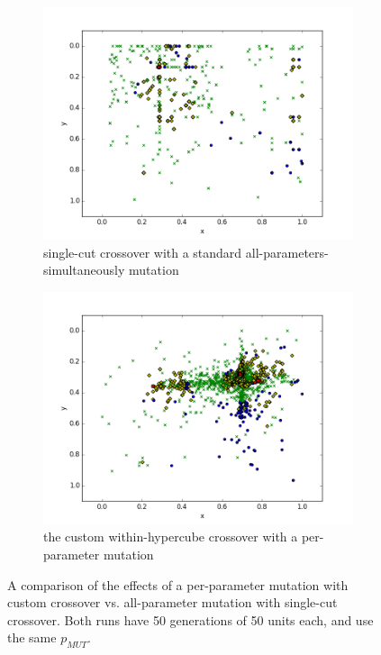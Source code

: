 \documentclass[times, utf8, diplomski]{fer}
\begin{document}
\begin{figure}[htp]
    \vspace{-50pt}      %
    \centering
    \begin{subfigure}[b]{\textwidth}
        \includegraphics[width=\textwidth]{images/mutation_crossover_effect_comparison_traditional.png}
        \caption{single-cut crossover with a standard all-parameters-simultaneously mutation}
    \end{subfigure}

    \begin{subfigure}[b]{\textwidth}
        \includegraphics[width=\textwidth]{images/mutation_crossover_effect_comparison_myalgo.png}
        \caption{the custom within-hypercube crossover with a per-parameter mutation}
    \end{subfigure}
    \caption{A comparison of the effects of a per-parameter mutation with custom
             crossover vs. all-parameter mutation with single-cut crossover. Both
             runs have 50 generations of 50 units each, and use the same $p_{MUT}$.
    }
    \label{fig:weaker_effect}
\end{figure}
\end{document}
